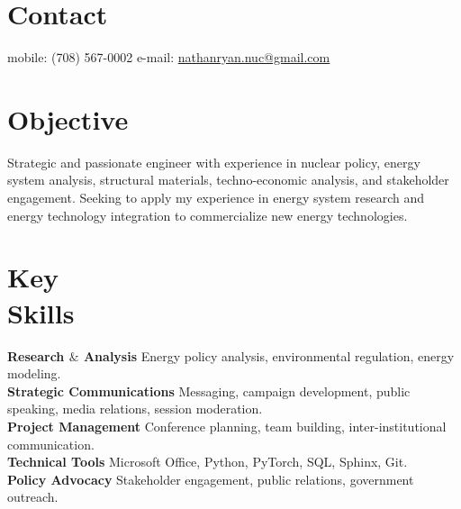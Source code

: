 \documentclass[margin,line]{resume}
\begin{document}
\begin{resume}

%


    \section{\mysidestyle Contact}
    mobile: (708) 567-0002 \hfill e-mail: \href{mailto:nathanryan.nuc@gmail.com}{nathanryan.nuc@gmail.com} \hfill \hfill  \hfill \hspace{0mm}\\\vspace{1mm}%

    \vspace{-6mm}
    \section{\mysidestyle Objective}
        Strategic and passionate engineer with experience in nuclear policy, energy system analysis, structural materials, techno-economic analysis, and stakeholder engagement. Seeking to apply my experience in energy system research and energy technology integration to commercialize new energy technologies.
    \section{\mysidestyle Key\\Skills}
        \textbf{Research $\&$ Analysis} Energy policy analysis, environmental regulation, energy modeling.\vspace{1mm}\\
        \textbf{Strategic Communications} Messaging, campaign development, public speaking, media relations, session moderation.\vspace{1mm}\\
        \textbf{Project Management} Conference planning, team building, inter-institutional communication.\vspace{1mm}\\
        \textbf{Technical Tools} Microsoft Office, Python, PyTorch, SQL, Sphinx, Git.\vspace{1mm}\\
        \textbf{Policy Advocacy} Stakeholder engagement, public relations, government outreach.\vspace{1mm}


\end{resume}
\end{document}

